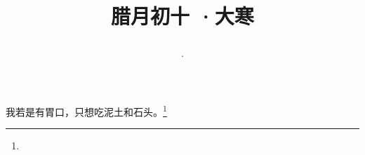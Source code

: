 \title{\date[d=20,m=1,y=2024][year:cn-y,年,month:cn,day:cn,日,·,weekday]·腊月初十 ·大寒}
我若是有胃口，只想吃泥土和石头。\footnote{ }

